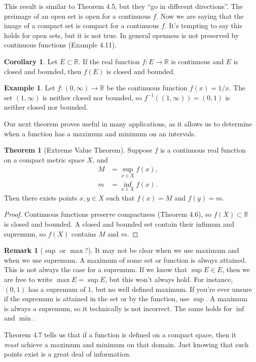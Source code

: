 \documentclass{article}
\newcommand{\R}{\mathbb{R}}
\theoremstyle{definition}
\newtheorem{theorem}{Theorem}[section]
\newtheorem{corollary}{Corollary}[section]
\newtheorem{example}{Example}[section]
\newtheorem{remark}{Remark}[section]
\begin{document}
This result is similar to Theorem 4.5, but they ``go in different directions''. The preimage of an open set is open for a continuous $ f $. Now we are saying that the image of a compact set is compact for a continuous $ f $. It's tempting to say this holds for open sets, but it is not true. In general openness is not preserved by continuous functions (Example 4.11).
\begin{corollary}
	Let $ E\subset\R $. If the real function $ f:E\to\R $ is continuous and $ E $ is closed and bounded, then $ f(E) $ is closed and bounded.
\end{corollary}
\begin{example}
	Let $ f:(0,\infty)\to\R $ be the continuous function $ f(x)=1/x $. The set $ (1,\infty) $ is neither closed nor bounded, so $ f^{-1}((1,\infty))=(0,1) $ is neither closed nor bounded. 
\end{example}
Our next theorem proves useful in many applications, as it allows us to determine when a function has a maximum and minimum on an intervals. 
\begin{theorem}[Extreme Value Theorem]
	Suppose $ f $ is a continuous real function on a compact metric space $ X $, and \begin{align*}
		M&=\sup\limits_{x\in X}f(x),\\
		m&=\inf\limits_{x\in X}f(x).
	\end{align*}
	Then there exists points $ x,y\in X $ such that $ f(x)=M $ and $ f(y)=m $.
\end{theorem}
\begin{proof}
	Continuous functions preserve compactness (Theorem 4.6), so $ f(X)\subset\R $ is closed and bounded. A closed and bounded set contain their infimum and supremum, so $ f(X) $ contains $ M $ and $ m $. 
\end{proof}
\begin{remark}[$ \sup $ or $ \max $?]
	It may not be clear when we use maximum and when we use supremum. A maximum of some set or function is always attained. This is not always the case for a supremum. If we know that $ \sup E\in E $, then we are free to write $ \max E=\sup E $, but this won't always hold. For instance, $ (0,1) $ has a supremum of $ 1 $, but no well defined maximum. If you're ever unsure if the supremum is attained in the set or by the function, use $ \sup $. A maximum is always a supremum, so it technically is not incorrect. The same holds for $ \inf $ and $ \min $.
\end{remark}
Theorem 4.7 tells us that if a function is defined on a compact space, then it \textit{must} achieve a maximum and minimum on that domain. Just knowing that such points exist is a great deal of information. 
\end{document}
